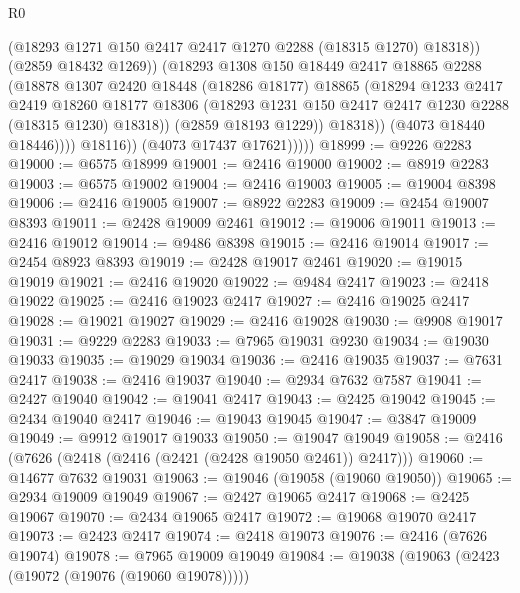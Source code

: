 \begin{lexlean}{R0}
\begin{coremodule}
                            (@18293 @1271 @150 @2417 @2417 @1270 @2288 (@18315 @1270) @18318))
                          (@2859 @18432 @1269))
                        (@18293
                          @1308
                          @150
                          @18449
                          @2417
                          @18865
                          @2288
                          (@18878
                            @1307
                            @2420
                            @18448
                            (@18286 @18177)
                            @18865
                            (@18294
                              @1233
                              @2417
                              @2419
                              @18260
                              @18177
                              @18306
                              (@18293 @1231 @150 @2417 @2417 @1230 @2288 (@18315 @1230) @18318))
                            (@2859 @18193 @1229))
                          @18318))
                      (@4073 @18440 @18446))))
                @18116))
            (@4073 @17437 @17621)))))
@18999 := @9226 @2283
@19000 := @6575 @18999
@19001 := @2416 @19000
@19002 := @8919 @2283
@19003 := @6575 @19002
@19004 := @2416 @19003
@19005 := @19004 @8398
@19006 := @2416 @19005
@19007 := @8922 @2283
@19009 := @2454 @19007 @8393
@19011 := @2428 @19009 @2461
@19012 := @19006 @19011
@19013 := @2416 @19012
@19014 := @9486 @8398
@19015 := @2416 @19014
@19017 := @2454 @8923 @8393
@19019 := @2428 @19017 @2461
@19020 := @19015 @19019
@19021 := @2416 @19020
@19022 := @9484 @2417
@19023 := @2418 @19022
@19025 := @2416 @19023 @2417
@19027 := @2416 @19025 @2417
@19028 := @19021 @19027
@19029 := @2416 @19028
@19030 := @9908 @19017
@19031 := @9229 @2283
@19033 := @7965 @19031 @9230
@19034 := @19030 @19033
@19035 := @19029 @19034
@19036 := @2416 @19035
@19037 := @7631 @2417
@19038 := @2416 @19037
@19040 := @2934 @7632 @7587
@19041 := @2427 @19040
@19042 := @19041 @2417
@19043 := @2425 @19042
@19045 := @2434 @19040 @2417
@19046 := @19043 @19045
@19047 := @3847 @19009
@19049 := @9912 @19017 @19033
@19050 := @19047 @19049
@19058 := @2416 (@7626 (@2418 (@2416 (@2421 (@2428 @19050 @2461)) @2417)))
@19060 := @14677 @7632 @19031
@19063 := @19046 (@19058 (@19060 @19050))
@19065 := @2934 @19009 @19049
@19067 := @2427 @19065 @2417
@19068 := @2425 @19067
@19070 := @2434 @19065 @2417
@19072 := @19068 @19070 @2417
@19073 := @2423 @2417
@19074 := @2418 @19073
@19076 := @2416 (@7626 @19074)
@19078 := @7965 @19009 @19049
@19084 := @19038 (@19063 (@2423 (@19072 (@19076 (@19060 @19078)))))

\end{coremodule}
\end{lexlean}
